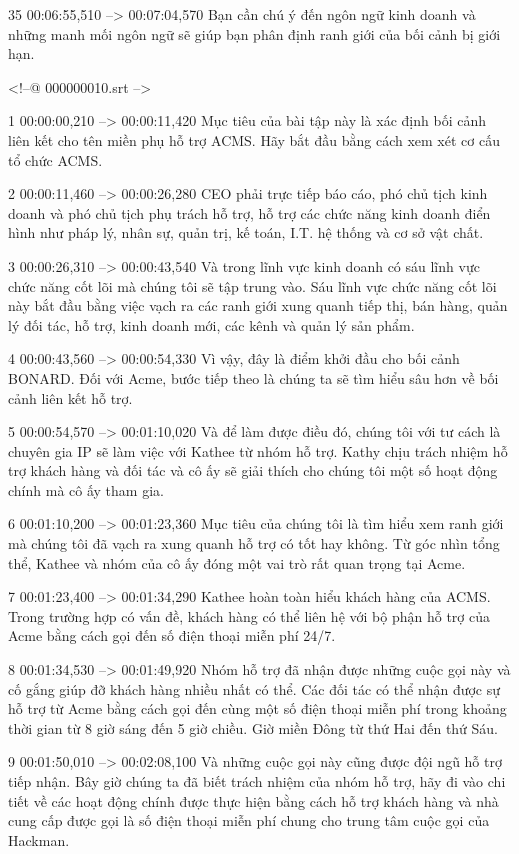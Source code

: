 35
00:06:55,510 --> 00:07:04,570
Bạn cần chú ý đến ngôn ngữ kinh doanh và những manh mối ngôn ngữ sẽ giúp bạn phân định ranh giới của bối cảnh bị giới hạn.

<!--@ 000000010.srt -->

1
00:00:00,210 --> 00:00:11,420
Mục tiêu của bài tập này là xác định bối cảnh liên kết cho tên miền phụ hỗ trợ ACMS.  Hãy bắt đầu bằng cách xem xét cơ cấu tổ chức ACMS.

2
00:00:11,460 --> 00:00:26,280
CEO phải trực tiếp báo cáo, phó chủ tịch kinh doanh và phó chủ tịch phụ trách hỗ trợ, hỗ trợ các chức năng kinh doanh điển hình như pháp lý, nhân sự, quản trị, kế toán, I.T.  hệ thống và cơ sở vật chất.

3
00:00:26,310 --> 00:00:43,540
Và trong lĩnh vực kinh doanh có sáu lĩnh vực chức năng cốt lõi mà chúng tôi sẽ tập trung vào.  Sáu lĩnh vực chức năng cốt lõi này bắt đầu bằng việc vạch ra các ranh giới xung quanh tiếp thị, bán hàng, quản lý đối tác, hỗ trợ, kinh doanh mới, các kênh và quản lý sản phẩm.

4
00:00:43,560 --> 00:00:54,330
Vì vậy, đây là điểm khởi đầu cho bối cảnh BONARD.  Đối với Acme, bước tiếp theo là chúng ta sẽ tìm hiểu sâu hơn về bối cảnh liên kết hỗ trợ.

5
00:00:54,570 --> 00:01:10,020
Và để làm được điều đó, chúng tôi với tư cách là chuyên gia IP sẽ làm việc với Kathee từ nhóm hỗ trợ.  Kathy chịu trách nhiệm hỗ trợ khách hàng và đối tác và cô ấy sẽ giải thích cho chúng tôi một số hoạt động chính mà cô ấy tham gia.

6
00:01:10,200 --> 00:01:23,360
Mục tiêu của chúng tôi là tìm hiểu xem ranh giới mà chúng tôi đã vạch ra xung quanh hỗ trợ có tốt hay không.  Từ góc nhìn tổng thể, Kathee và nhóm của cô ấy đóng một vai trò rất quan trọng tại Acme.

7
00:01:23,400 --> 00:01:34,290
Kathee hoàn toàn hiểu khách hàng của ACMS.  Trong trường hợp có vấn đề, khách hàng có thể liên hệ với bộ phận hỗ trợ của Acme bằng cách gọi đến số điện thoại miễn phí 24/7.

8
00:01:34,530 --> 00:01:49,920
Nhóm hỗ trợ đã nhận được những cuộc gọi này và cố gắng giúp đỡ khách hàng nhiều nhất có thể.  Các đối tác có thể nhận được sự hỗ trợ từ Acme bằng cách gọi đến cùng một số điện thoại miễn phí trong khoảng thời gian từ 8 giờ sáng đến 5 giờ chiều.  Giờ miền Đông từ thứ Hai đến thứ Sáu.

9
00:01:50,010 --> 00:02:08,100
Và những cuộc gọi này cũng được đội ngũ hỗ trợ tiếp nhận.  Bây giờ chúng ta đã biết trách nhiệm của nhóm hỗ trợ, hãy đi vào chi tiết về các hoạt động chính được thực hiện bằng cách hỗ trợ khách hàng và nhà cung cấp được gọi là số điện thoại miễn phí chung cho trung tâm cuộc gọi của Hackman.

